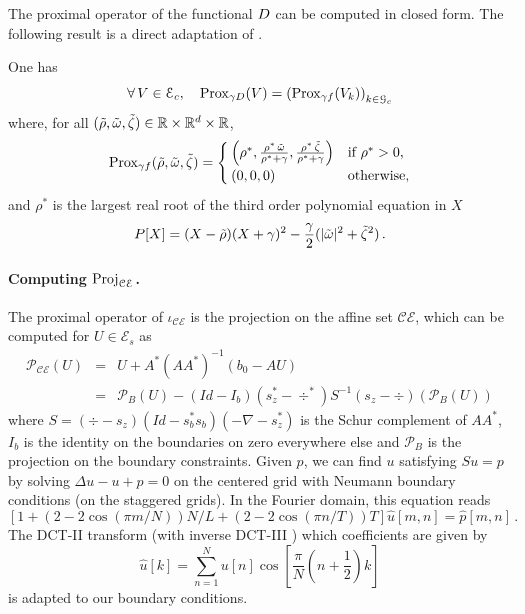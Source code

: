The proximal operator of the functional $D$ can be computed in closed form. The following result is a direct adaptation of \cite{papadakis2014optimal}.

\begin{proposition}
One has
\[
\forall \, V \in \mathcal{E}_c, \quad \mathop{}\mathopen{}\mathrm{Prox}_{\gamma D}(V) = \left( \mathop{}\mathopen{}\mathrm{Prox}_{\gamma f}(V_k)\right)_{k \in \mathcal{G}_c}
\]
where, for all $(\tilde{\rho},\tilde{\omega}, \tilde{\zeta}) \in \mathbb{R} \times \mathbb{R}^d \times \mathbb{R}$,
\[
\mathop{}\mathopen{}\mathrm{Prox}_{\gamma f}(\tilde{\rho},\tilde{\omega}, \tilde{\zeta})  =
\begin{cases}
 \left( \rho^*, \frac{\rho^* \, \tilde{\omega}}{\rho^* + \gamma},\frac{\rho^* \, \tilde{\zeta}}{\rho^* + \gamma} \right) & \text{if $\rho^*>0$,}\\
 ( 0, 0, 0) & \text{otherwise},
\end{cases}
\]
and $\rho^*$ is the largest real root of the third order polynomial equation in $X$
\[
 P[X] = (X-\tilde{\rho})(X+\gamma)^2 - \frac{\gamma}{2} (|\tilde{\omega}|^2+\tilde{\zeta}^2) \, .
 \]
\end{proposition}

\paragraph{Computing $\mathop{}\mathopen{}\mathrm{Proj}_{\mathcal{CE}}$.}

The proximal operator of $\iota_{\mathcal{CE}}$ is the projection on the affine set $\mathcal{CE}$, which can be computed for $U \in \mathcal{E}_s$ as
 \begin{eqnarray}
\mathcal{P}_\mathcal{CE} (U) & = & U + A^* (A A^*)^{-1}(b_0 -AU) \\
& = & \mathcal{P}_B (U) - (Id-I_b)(s_z^* -\div^*) S^{-1} (s_z - \div ) (\mathcal{P}_B (U))
\end{eqnarray}
where $S=(\div - s_z)(Id - s_b^* s_b)(-\nabla - s_z^*)$ is the Schur complement of $AA^*$, $I_b$ is the identity on the boundaries on zero everywhere else and $\mathcal{P}_B$ is the projection on the boundary constraints. Given $p$, we can find $u$ satisfying $Su=p$ by solving $\Delta u -u + p=0$ on the centered grid with Neumann boundary conditions (on the staggered grids). In the Fourier domain, this equation reads
\[
\left[ 1 + (2- 2\cos( \pi m /N) )N/L + (2- 2\cos( \pi n/T) )T \right]   \hat{u}[m,n] = \hat{p}[m,n] \, .
\]
The DCT-II transform (with inverse DCT-III ) which coefficients are given by
\[
\hat{u}[k] = \sum_{n=1}^{N} u[n] \cos \left[ \frac{\pi}{N} (n+\frac{1}{2})k  \right]
\]
is adapted to our boundary conditions.

